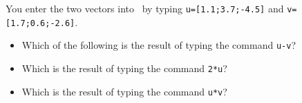 \begin{activity}
You enter the two vectors into \script[1]\ by typing \verb|u=[1.1;3.7;-4.5]| and \verb|v=[1.7;0.6;-2.6]|.
\begin{itemize}
\item Which of the following is the result of typing the command \verb|u-v|?
\item Which is the result of typing the command \verb|2*u|?
\item Which is the result of typing the command \verb|u*v|?
\end{itemize}
\end{activity}






